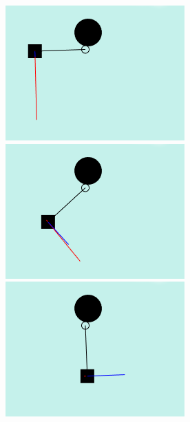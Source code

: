 \documentclass[]{report}
\begin{document}
			\begin{figure}[H]
				\centering
				\begin{subfigure}[b]{1\textwidth}
				\centering
		        \includegraphics[scale=0.4]{swingingMotionLeftTop}
		        \includegraphics[scale=0.4]{swingingMotionLeftLower}
		        \includegraphics[scale=0.4]{swingingMotionBottom}
		        \end{subfigure}
		        
		        \vspace{3 pt}
		        

\end{figure}
\end{document}
